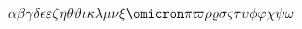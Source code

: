 $
      \alpha
      \beta
      \gamma
      \delta
      \epsilon
      \varepsilon
      \zeta
      \eta
      \theta
      \vartheta
      \iota
      \kappa
      \lambda
      \mu
      \nu
      \xi
      \omicron
      \pi
      \varpi
      \rho
      \varrho
      \sigma
      \varsigma
      \tau
      \upsilon
      \phi
      \varphi
      \chi
      \psi
      \omega
$
